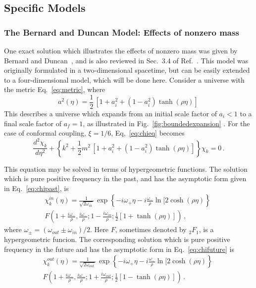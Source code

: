 \documentclass[12pt,onecolumn,eqsecnum,floats,aps,prd,floatfix,titlepage]{revtex4-2}
\begin{document}
\subsection{Specific Models}
\label{sec:specific}

\subsubsection{The Bernard and Duncan Model: Effects of nonzero mass}
\label{sec:BD}
 One exact solution which illustrates the effects of nonzero mass was given by Bernard and 
 Duncan~\cite{BeDu}, and is also reviewed in Sec.~3.4 of  Ref.~\cite{BD}. This model was 
 originally formulated in a two-dimensional spacetime, but can be easily extended to a four-dimensional model, 
 which will be done here. Consider a universe with the metric  Eq.~\eqref{eq:metric}, where
  \begin{equation}
 a^2(\eta) = \frac{1}{2}\, [1 + a_i^2 +(1-a_i^2) \tanh(\rho \eta)]\,
 \label{eq:BD-scale}
 \end{equation}
This describes a universe which expands from an initial scale factor of $a_i < 1$ to a final
scale factor of $a_f =1$, as illustrated in Fig.~\ref{fig:boundedexpansion}  . For the case of conformal coupling, $\xi =1/6$,
Eq,~\eqref{eq:chieq} becomes
 \begin{equation}
 {\frac{d^2\chi_k}{d\eta^2}} + \left\{ k^2 +  \frac{1}{2} m^2\, \left[1 + a_i^2 +(1-a_i^2) \tanh(\rho \eta)\right]\right\}\chi_{k} =0 \, .
                                                 \label{eq:chieq-BD}
 \end{equation} 

This equation may be solved in terms of hypergeometric functions. The solution which is pure positive 
frequency in the past, and has the asymptotic form given in Eq.~\eqref{eq:chipast}, is
 \begin{multline}
 \chi^{in}_k(\eta) =    \frac{1}{\sqrt{2\omega_{in}}}\, \exp\left\{-i \omega_{+}   \eta - i \frac{\omega_{-}}{ \rho} \ln[2 \cosh(\rho \eta) \right\}\;\\
 F\left(1+\frac{i \omega_{-}}{\rho}, \frac{i \omega_{-}}{\rho}; 1-\frac{i \omega_{in}}{\rho}; 
\frac{1}{2} [1+ \tanh(\rho \eta)] \right)\,,
\label{eq:chi-in}
 \end{multline}
 where $\omega_\pm = (\omega_{out} \pm \omega_{in})/2$. Here $F$, sometimes denoted by ${}_2F_1$, is a hypergeometric funcion.
The corresponding solution which  is pure positive  frequency in the future and has the asymptotic form in Eq.~\eqref{eq:chifuture} is
 \begin{multline}
 \chi^{out}_k(\eta) =  \frac{1}{\sqrt{2\omega_{out}}}\, \exp\left\{-i \omega_{+}   \eta - i \frac{\omega_{-}}{ \rho} \ln[2 \cosh(\rho \eta) \right\}\;\\
 F\left(1+\frac{i \omega_{-}}{\rho}, \frac{i \omega_{-}}{\rho}; 1 + \frac{i \omega_{out}}{\rho}; 
\frac{1}{2} [1- \tanh(\rho \eta)] \right)\,.
\label{eq:chi-out}
 \end{multline}
 
\end{document}
